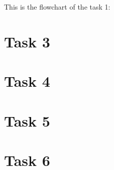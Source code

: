\documentclass[a4paper,12pt]{article}
\begin{document}
\newpage
This is the flowchart of the task 1:
\begin{center}
\end{center}


\section{Task 3}


\section{Task 4}


\section{Task 5}


\section{Task 6}





\end{document}
